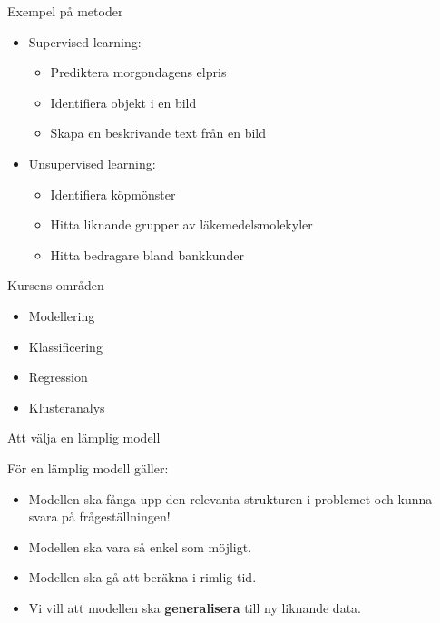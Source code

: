 \documentclass[10pt,english]{beamer}
\begin{document}
\begin{frame}{Exempel på metoder}
    \begin{itemize}
        \item Supervised learning:
        \begin{itemize}
            \item Prediktera morgondagens elpris
            \item Identifiera objekt i en bild
            \item Skapa en beskrivande text från en bild
        \end{itemize}
        \item Unsupervised learning:
        \begin{itemize}
            \item Identifiera köpmönster
            \item Hitta liknande grupper av läkemedelsmolekyler
            \item Hitta bedragare bland bankkunder
        \end{itemize}
    \end{itemize}
\end{frame}

\begin{frame}{Kursens områden}
    \begin{itemize}
        \item Modellering
        \item Klassificering
        \item Regression
        \item Klusteranalys
    \end{itemize}
\end{frame}

\begin{frame}{Att välja en lämplig modell}

    För en lämplig modell gäller:
    \begin{itemize}
        \item Modellen ska fånga upp den relevanta strukturen i problemet och kunna svara på frågeställningen!
        \item Modellen ska vara så enkel som möjligt.
        \item Modellen ska gå att beräkna i rimlig tid.
        \item Vi vill att modellen ska \textbf{generalisera} till ny liknande data.
    \end{itemize}

\end{frame}
\end{document}
